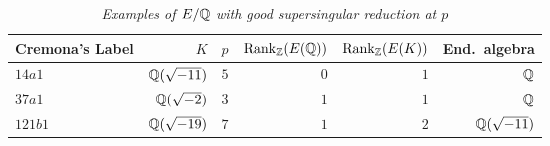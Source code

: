 \documentclass[a4paper,11pt]{article}
\numberwithin{equation}{section}
\begin{document}
\begin{table}[H]	\caption{\label{table:supersingular}\emph{Examples of $E/\mathbb{Q}$ with good supersingular reduction at $p$}}
\begin{tabular}[t]{lrrrrr}\toprule
 Cremona's Label          &  $K$    &  $p$    & $\mathrm{Rank}_{\mathbb{Z}}(E(\mathbb{Q}))$   & $\mathrm{Rank}_{\mathbb{Z}}(E(K))$ &   End.~algebra    \\ \midrule

$14a1$   &   $\mathbb{Q}(\sqrt{-11})$  &  $5$ &  $0$   &    $1$  & $\mathbb{Q}$   \\\addlinespace
$37a1$ &   $\mathbb{Q}(\sqrt{-2})$  & $3$    &  $1$   & $1$    & $\mathbb{Q}$   \\\addlinespace
$121b1$ &   $\mathbb{Q}(\sqrt{-19})$   &   $7$ &  $1$   & $2$    & $\mathbb{Q}(\sqrt{-11})$     \\
\bottomrule
\end{tabular}
\end{table}


\begin{comment}
\begin{enumerate}
\item[(1CMord7)] (CM by $\Q(\sqrt{-3})$),  $K=\Q(\sqrt{-2})$, $\mathrm{Rank}_\Q E(\Q)=0$, $\mathrm{Rank}_\Q E_K(\Q)=1$, $p=7$ is ordinary .
\item[(1CMord5)] $E=32a1$ (CM by $\Q(\sqrt{-1})$),  $K=\Q(\sqrt{-7})$, $\mathrm{Rank}_\Q E(\Q)=0$, $\mathrm{Rank}_\Q E_K(\Q)=1$, $p=5$ is ordinary .
\item[(3CMord3)] $E=121b1$ (CM by $\Q(\sqrt{-11})$),  $K=\Q(\sqrt{-19})$, $\mathrm{Rank}_\Q E(\Q)=1$, $\mathrm{Rank}_\Q E_K(\Q)=2$, $p=3$ is ordinary .



\item[(1SS5)] $E=14a1$,  $K=\Q(\sqrt{-11})$, $\mathrm{Rank}_\Q E(\Q)=0$, $\mathrm{Rank}_\Q E_K(\Q)=1$, $p=5$ is supersingular (not CM).
\item[(2SS3)] $E=37a1$,  $K=\Q(\sqrt{-2})$, $\mathrm{Rank}_\Q E(\Q)=1$, $\mathrm{Rank}_\Q E_K(\Q)=1$, $p=3$ is supersingular (not CM).
\item[(3SS7)] $E=121b1$,  $K=\Q(\sqrt{-19})$, $\mathrm{Rank}_\Q E(\Q)=1$, $\mathrm{Rank}_\Q E_K(\Q)=2$, $p=7$ is supersingular (CM).
\end{enumerate}
\end{comment}
\end{document}
